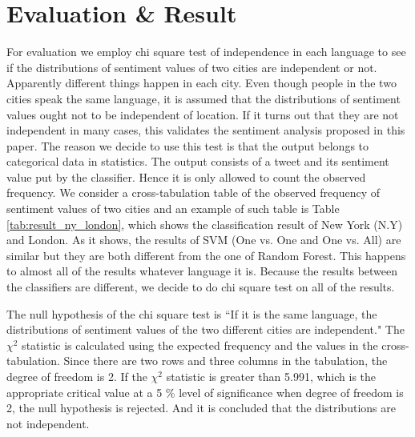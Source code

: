 \documentclass[twocolumn]{article}
\begin{document}
\section{Evaluation \& Result}
\vspace{-2mm}
For evaluation we employ chi square test of independence in each language to see if the distributions of sentiment values of two cities are independent or not. 
Apparently different things happen in each city.
Even though people in the two cities speak the same language, it is assumed that the distributions of sentiment values ought not to be independent of location.  
If it turns out that they are not independent in many cases, this validates the sentiment analysis proposed in this paper.
The reason we decide to use this test is that the output belongs to categorical data in statistics.
The output consists of a tweet and its sentiment value put by the classifier.
Hence it is only allowed to count the observed frequency.
We consider a cross-tabulation table of the observed frequency of sentiment values of two cities and an example of such table is Table \ref{tab:result_ny_london}, which shows the classification result of New York (N.Y) and London.
As it shows, the results of SVM (One vs. One and One vs. All) are similar but they are both different from the one of Random Forest.
This happens to almost all of the results whatever language it is.
Because the results between the classifiers are different, we decide to do chi square test on all of the results.

The null hypothesis of the chi square test is ``If it is the same language, the distributions of sentiment values of the two different cities are independent."
The $\chi^2$ statistic is calculated using the expected frequency and the values in the cross-tabulation.
Since there are two rows and three columns in the tabulation, the degree of freedom is 2.
If the $\chi^2$ statistic is greater than 5.991, which is the appropriate critical value at a 5 \% level of significance when degree of freedom is 2, the null hypothesis is rejected.
And it is concluded that the distributions are not independent. 
\end{document}
